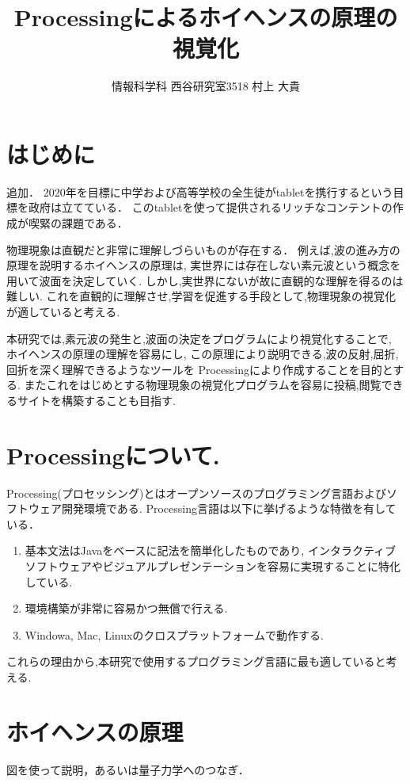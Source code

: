 \documentclass[a4j,twocolumn,uplatex]{jarticle}
\begin{document}
\title{Processingによるホイヘンスの原理の視覚化}
\author{情報科学科 西谷研究室3518 村上 大貴}
\date{}
\maketitle
\section{はじめに}
追加．
2020年を目標に中学および高等学校の全生徒がtabletを携行するという目標を政府は立てている\cite{tablet}．
このtabletを使って提供されるリッチなコンテントの作成が喫緊の課題である．

物理現象は直観だと非常に理解しづらいものが存在する．
例えば,波の進み方の原理を説明するホイヘンスの原理は,
実世界には存在しない素元波という概念を用いて波面を決定していく.
しかし,実世界にないが故に直観的な理解を得るのは難しい.
これを直観的に理解させ,学習を促進する手段として,物理現象の視覚化が適していると考える.

本研究では,素元波の発生と,波面の決定をプログラムにより視覚化することで,
ホイヘンスの原理の理解を容易にし,
この原理により説明できる,波の反射,屈折,回折を深く理解できるようなツールを
Processingにより作成することを目的とする.
またこれをはじめとする物理現象の視覚化プログラムを容易に投稿,閲覧できるサイトを構築することも目指す.

\section{Processingについて.}
Processing(プロセッシング)とはオープンソースのプログラミング言語およびソフトウェア開発環境である.
Processing言語は以下に挙げるような特徴を有している\cite{ishikawa}．
\begin{enumerate}
\item 基本文法はJavaをベースに記法を簡単化したものであり,
インタラクティブソフトウェアやビジュアルプレゼンテーションを容易に実現することに特化している.
\item 環境構築が非常に容易かつ無償で行える.
\item Windowa, Mac, Linuxのクロスプラットフォームで動作する.
\end{enumerate}
これらの理由から,本研究で使用するプログラミング言語に最も適していると考える.

\section{ホイヘンスの原理}

図を使って説明，あるいは量子力学へのつなぎ．
\end{document}
